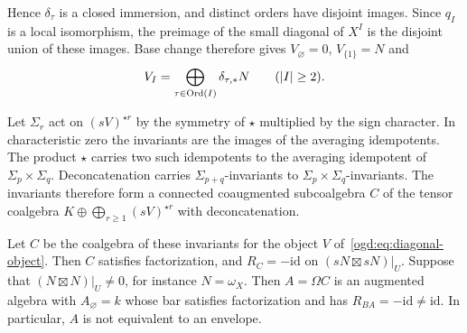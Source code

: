 Hence \(\delta_\tau\) is a closed immersion, and distinct orders have disjoint images.
Since \(q_I\) is a local isomorphism, the preimage of the small diagonal of \(X^I\) is the disjoint union of these images.
Base change therefore gives \(V_\varnothing=0\), \(V_{\{1\}}=N\) and
\begin{equation}\label{ogd:eq:diagonal-object}
 V_I=\bigoplus_{\tau\in\operatorname{Ord}(I)}\delta_{\tau,*}N\qquad(|I|\geq2).
\end{equation}

Let\label{ogd:def:signed-invariant-coalgebra} \(\Sigma_r\) act on \((sV)^{\star r}\) by the symmetry of \(\star\) multiplied by the sign character.
In characteristic zero the invariants are the images of the averaging idempotents.
The product \(\star\) carries two such idempotents to the averaging idempotent of \(\Sigma_p\times\Sigma_q\).
Deconcatenation carries \(\Sigma_{p+q}\)-invariants to \(\Sigma_p\times\Sigma_q\)-invariants.
The invariants therefore form a connected coaugmented subcoalgebra \(C\) of the tensor coalgebra \(K\oplus\bigoplus_{r\geq1}(sV)^{\star r}\) with deconcatenation.

\begin{proposition}\label{ogd:prop:sign-exchange}
Let \(C\) be the coalgebra of these invariants for the object \(V\) of~\eqref{ogd:eq:diagonal-object}.
Then \(C\) satisfies factorization, and \(R_C=-\mathrm{id}\) on \((sN\boxtimes sN)|_U\).
Suppose that \((N\boxtimes N)|_U\ne0\), for instance \(N=\omega_X\).
Then \(A=\Omega C\) is an augmented algebra with \(A_\varnothing=k\) whose bar satisfies factorization and has \(R_{BA}=-\mathrm{id}\ne\mathrm{id}\).
In particular, \(A\) is not equivalent to an envelope.
\end{proposition}

